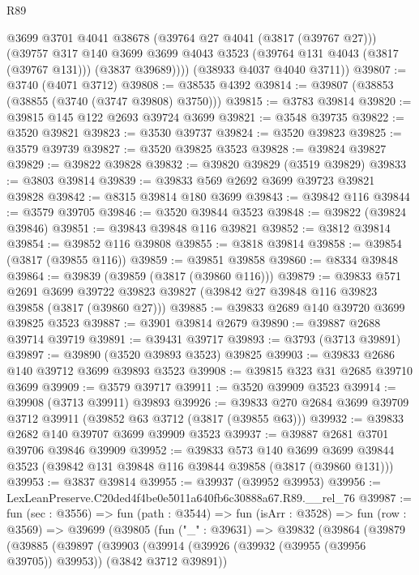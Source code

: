 \begin{lexlean}{R89}
\begin{coremodule}
          @3699
          @3701
          @4041
          @38678
          (@39764 @27 @4041 (@3817 (@39767 @27)))
          (@39757
            @317
            @140
            @3699
            @3699
            @4043
            @3523
            (@39764 @131 @4043 (@3817 (@39767 @131)))
            (@3837 @39689))))
      (@38933 @4037 @4040 @3711))
@39807 := @3740 (@4071 @3712)
@39808 := @38535 @4392
@39814 := @39807 (@38853 (@38855 (@3740 (@3747 @39808) @3750)))
@39815 := @3783 @39814
@39820 := @39815 @145 @122 @2693 @39724 @3699
@39821 := @3548 @39735
@39822 := @3520 @39821
@39823 := @3530 @39737
@39824 := @3520 @39823
@39825 := @3579 @39739
@39827 := @3520 @39825 @3523
@39828 := @39824 @39827
@39829 := @39822 @39828
@39832 := @39820 @39829 (@3519 @39829)
@39833 := @3803 @39814
@39839 := @39833 @569 @2692 @3699 @39723 @39821 @39828
@39842 := @8315 @39814 @180 @3699
@39843 := @39842 @116
@39844 := @3579 @39705
@39846 := @3520 @39844 @3523
@39848 := @39822 (@39824 @39846)
@39851 := @39843 @39848 @116 @39821
@39852 := @3812 @39814
@39854 := @39852 @116 @39808
@39855 := @3818 @39814
@39858 := @39854 (@3817 (@39855 @116))
@39859 := @39851 @39858
@39860 := @8334 @39848
@39864 := @39839 (@39859 (@3817 (@39860 @116)))
@39879 := @39833
    @571
    @2691
    @3699
    @39722
    @39823
    @39827
    (@39842 @27 @39848 @116 @39823 @39858 (@3817 (@39860 @27)))
@39885 := @39833 @2689 @140 @39720 @3699 @39825 @3523
@39887 := @3901 @39814 @2679
@39890 := @39887 @2688 @39714 @39719
@39891 := @39431 @39717
@39893 := @3793 (@3713 @39891)
@39897 := @39890 (@3520 @39893 @3523) @39825
@39903 := @39833 @2686 @140 @39712 @3699 @39893 @3523
@39908 := @39815 @323 @31 @2685 @39710 @3699
@39909 := @3579 @39717
@39911 := @3520 @39909 @3523
@39914 := @39908 (@3713 @39911) @39893
@39926 := @39833 @270 @2684 @3699 @39709 @3712 @39911 (@39852 @63 @3712 (@3817 (@39855 @63)))
@39932 := @39833 @2682 @140 @39707 @3699 @39909 @3523
@39937 := @39887 @2681 @3701 @39706 @39846 @39909
@39952 := @39833
    @573
    @140
    @3699
    @3699
    @39844
    @3523
    (@39842 @131 @39848 @116 @39844 @39858 (@3817 (@39860 @131)))
@39953 := @3837 @39814
@39955 := @39937 (@39952 @39953)
@39956 := LexLeanPreserve.C20ded4f4be0e5011a640fb6c30888a67.R89.__rel_76
@39987 := fun (sec : @3556) =>
  fun (path : @3544) =>
  fun (isArr : @3528) =>
  fun (row : @3569) =>
  @39699
    (@39805
      (fun ("_" : @39631) =>
      @39832
        (@39864
          (@39879
            (@39885
              (@39897
                (@39903
                  (@39914 (@39926 (@39932 (@39955 (@39956 @39705)) @39953)) (@3842 @3712 @39891))

\end{coremodule}
\end{lexlean}
